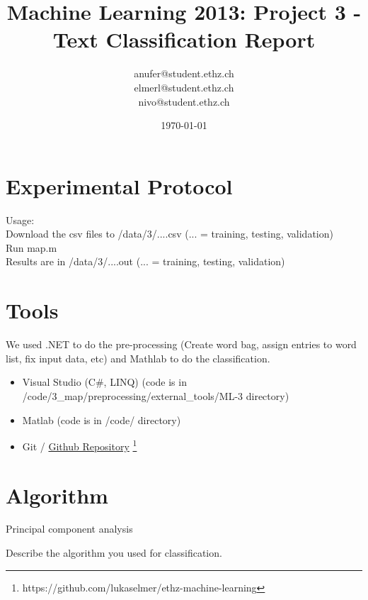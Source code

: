 \documentclass[a4paper, 11pt]{article}
\title{Machine Learning 2013: Project 3 - Text Classification Report}
\author{anufer@student.ethz.ch\\ elmerl@student.ethz.ch\\ nivo@student.ethz.ch\\}
\date{\today}
\begin{document}
\maketitle

\section*{Experimental Protocol}
Usage:\\
Download the csv files to /data/3/....csv (... = training, testing, validation)\\
Run map.m \\
Results are in /data/3/....out (... = training, testing, validation)










\section{Tools}
We used .NET to do the pre-processing (Create word bag, assign entries to word list, fix input data, etc) and Mathlab to do the classification.

\begin{itemize}
\item Visual Studio (C\#, LINQ) (code is in /code/3\_map/preprocessing/external\_tools/ML-3 directory)
\item Matlab (code is in /code/ directory)
\item Git / \href{https://github.com/lukaselmer/ethz-machine-learning}{Github Repository} \footnote{https://github.com/lukaselmer/ethz-machine-learning}
\end{itemize}

\section{Algorithm}

Principal component analysis

Describe the algorithm you used for classification.
\end{document}
